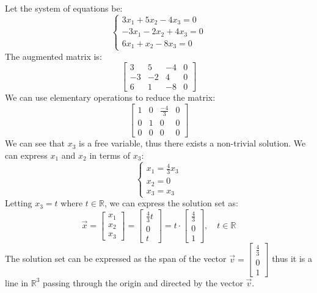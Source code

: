 \begin{eg}
    Let the system of equations be:
    \[
        \begin{cases}
            3x_1 + 5x_2 - 4x_3 = 0 \\
            -3x_1 - 2x_2 + 4x_3 = 0 \\
            6x_1 + x_2 - 8x_3 = 0
        \end{cases}
    \]
    The augmented matrix is:
    \[
        \begin{bmatrix}
            3 & 5 & -4 & 0 \\
            -3 & -2 & 4 & 0 \\
            6 & 1 & -8 & 0
        \end{bmatrix}
    \]
    We can use elementary operations to reduce the matrix:
    \[
        \begin{bmatrix}
            1 & 0 & \frac{-4}{3} & 0 \\
            0 & 1 & 0 & 0 \\
            0 & 0 & 0 & 0
        \end{bmatrix}
    \]
    We can see that $x_3$ is a free variable, thus there exists a non-trivial solution. We can express $x_1$ and $x_2$ in terms of $x_3$:
    \[
        \begin{cases}
            x_1 = \frac{4}{3}x_3 \\
            x_2 = 0 \\
            x_3 = x_3
        \end{cases}
    \]
    Letting $x_3 = t$ where $t \in \mathbb{R}$, we can express the solution set as:
    \[
        \vec{x} = \begin{bmatrix} x_1 \\ x_2 \\ x_3 \end{bmatrix} = \begin{bmatrix} \frac{4}{3}t \\ 0 \\ t \end{bmatrix} = t \cdot \begin{bmatrix} \frac{4}{3} \\ 0 \\ 1 \end{bmatrix}, \quad t \in \mathbb{R}
    \]
    The solution set can be expressed as the span of the vector $\vec{v} = \begin{bmatrix} \frac{4}{3} \\ 0 \\ 1 \end{bmatrix}$ thus it is a line in $\mathbb{R}^3$ passing through the origin and directed by the vector $\vec{v}$.
\end{eg}


